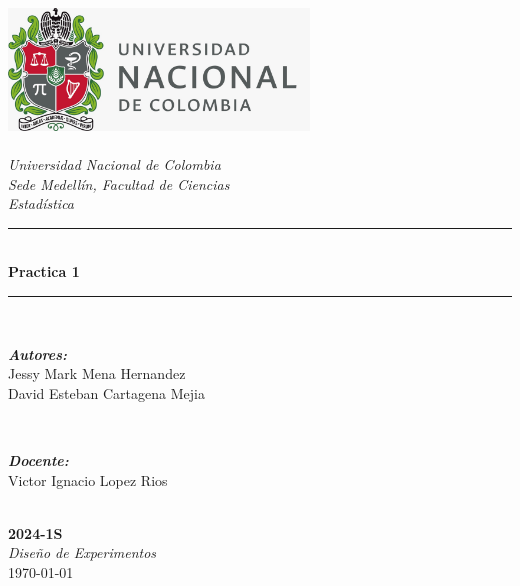 \begin{titlepage}
\newcommand{\HRule}{\rule{\linewidth}{0.5mm}}
\includegraphics[width=8cm]{Unal.jpeg}\\[0.5cm] 
\center 
\quad\\[1.0cm]
\textsl{\Large Universidad Nacional de Colombia}\\[0.5cm] 
\textsl{\large Sede Medellín, Facultad de Ciencias}\\[0.5cm] 
\textsl{\large Estadística}\\[1.5cm] 
\makeatletter
\HRule \\[0.6cm]
{ \huge \bfseries Practica 1}\\[0.4cm] 
\HRule \\[1.8cm]
\begin{minipage}{0.4\textwidth}
\begin{flushleft} \large
\emph{\textbf{Autores:}}\\
Jessy Mark Mena Hernandez \\
David Esteban Cartagena Mejia\\
\end{flushleft}
\end{minipage}
~
\begin{minipage}{0.4\textwidth}
\begin{flushright} \large
\emph{\textbf{Docente:}} \\
\textup{Victor Ignacio Lopez Rios}
\end{flushright}
\end{minipage}\\[3.2cm]
\makeatother
{\large \textbf{2024-1S}}\\[0.5cm]
{\large \emph{Diseño de Experimentos}}\\[0.6cm]
{\large \today}\\[2cm] 
\vfill 
\end{titlepage}